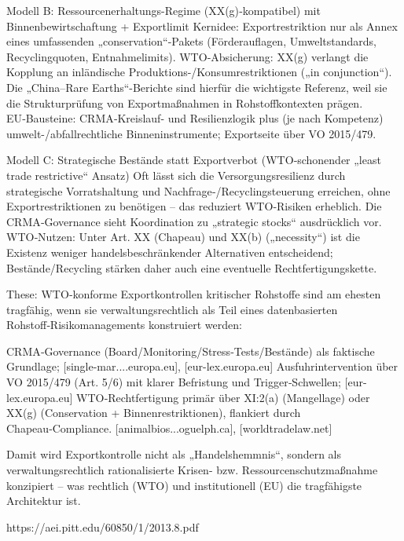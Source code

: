 \documentclass[12pt,a4paper,oneside]{book} %
\begin{document}
Modell B: Ressourcenerhaltungs-Regime (XX(g)‑kompatibel) mit Binnenbewirtschaftung + Exportlimit
Kernidee: Exportrestriktion nur als Annex eines umfassenden „conservation“-Pakets (Förderauflagen, Umweltstandards, Recyclingquoten, Entnahmelimits).
WTO‑Absicherung: XX(g) verlangt die Kopplung an inländische Produktions-/Konsumrestriktionen („in conjunction“). Die „China–Rare Earths“-Berichte sind hierfür die wichtigste Referenz, weil sie die Strukturprüfung von Exportmaßnahmen in Rohstoffkontexten prägen. 
EU‑Bausteine: CRMA‑Kreislauf- und Resilienzlogik plus (je nach Kompetenz) umwelt-/abfallrechtliche Binneninstrumente; Exportseite über VO 2015/479.

Modell C: Strategische Bestände statt Exportverbot (WTO‑schonender „least trade restrictive“ Ansatz)
Oft lässt sich die Versorgungsresilienz durch strategische Vorratshaltung und Nachfrage‑/Recyclingsteuerung erreichen, ohne Exportrestriktionen zu benötigen – das reduziert WTO‑Risiken erheblich. Die CRMA‑Governance sieht Koordination zu „strategic stocks“ ausdrücklich vor. 
WTO‑Nutzen: Unter Art. XX (Chapeau) und XX(b) („necessity“) ist die Existenz weniger handelsbeschränkender Alternativen entscheidend; Bestände/Recycling stärken daher auch eine eventuelle Rechtfertigungskette.

These: WTO‑konforme Exportkontrollen kritischer Rohstoffe sind am ehesten tragfähig, wenn sie verwaltungsrechtlich als Teil eines datenbasierten Rohstoff‑Risikomanagements konstruiert werden:

CRMA‑Governance (Board/Monitoring/Stress‑Tests/Bestände) als faktische Grundlage; [single-mar....europa.eu], [eur-lex.europa.eu]
Ausfuhrintervention über VO 2015/479 (Art. 5/6) mit klarer Befristung und Trigger‑Schwellen; [eur-lex.europa.eu]
WTO‑Rechtfertigung primär über XI:2(a) (Mangellage) oder XX(g) (Conservation + Binnenrestriktionen), flankiert durch Chapeau‑Compliance. [animalbios...oguelph.ca], [worldtradelaw.net]

Damit wird Exportkontrolle nicht als „Handelshemmnis“, sondern als verwaltungsrechtlich rationalisierte Krisen- bzw. Ressourcenschutzmaßnahme konzipiert – was rechtlich (WTO) und institutionell (EU) die tragfähigste Architektur ist.

https://aei.pitt.edu/60850/1/2013.8.pdf
\end{document}
